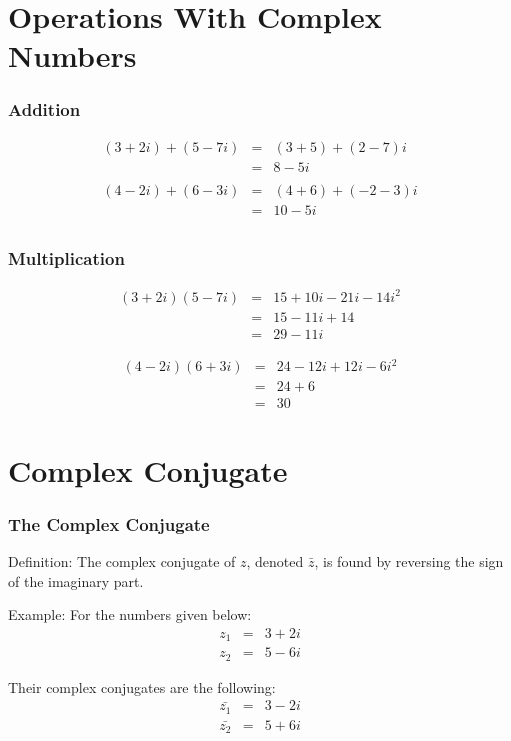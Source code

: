 \section{Operations With Complex Numbers}

\begin{frame}
  \frametitle{Addition}

  \begin{eqnarray*}
    (3+2i) + (5-7i) & = & (3+5) + (2-7)i \\
    & = & 8 - 5i\\
    ~ \\
    (4-2i) + (6-3i) & = & (4+6) + (-2-3)i \\
    & = & 10 - 5i \\
  \end{eqnarray*}

\end{frame}

\begin{frame}
  \frametitle{Multiplication}

  \begin{eqnarray*}
    (3+2i)(5-7i) & = & 15 + 10i - 21i - 14 i^2 \\
    & = & 15 - 11i + 14 \\
    & = & 29 - 11 i
  \end{eqnarray*}

  \begin{eqnarray*}
    (4-2i)(6+3i) & = & 24 - 12i + 12 i - 6i^2 \\
    & = & 24 + 6 \\
    & = & 30
  \end{eqnarray*}

\end{frame}


\section{Complex Conjugate}

\begin{frame}
  \frametitle{The Complex Conjugate}

  Definition: The complex conjugate of $z$, denoted $\bar{z}$, is
  found by reversing the sign of the imaginary part.
  
  Example:
  For the numbers given below:
  \begin{eqnarray*}
    z_1 & = & 3 + 2i \\
    z_2 & = & 5 - 6i 
  \end{eqnarray*}

  Their complex conjugates are the following:
  \begin{eqnarray*}
    \bar{z_1} & = & 3 - 2i \\
    \bar{z_2} & = & 5 + 6i 
  \end{eqnarray*}


\end{frame}

